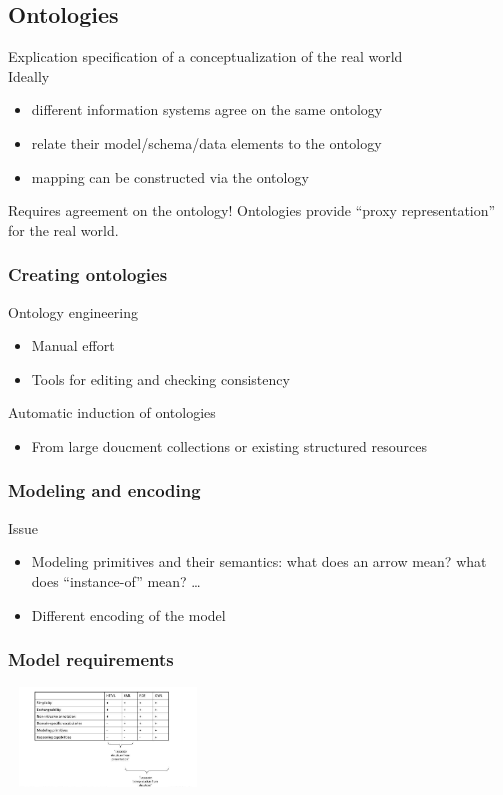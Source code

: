 \subsection{Ontologies}
Explication specification of a conceptualization of the real world \\
Ideally
\begin{itemize}
\item different information systems agree on the same ontology
\item relate their model/schema/data elements to the ontology
\item mapping can be constructed via the ontology
\end{itemize}

Requires agreement on the ontology! Ontologies provide ``proxy
representation'' for the real world.

\subsubsection{Creating ontologies}
Ontology engineering
\begin{itemize}
\item Manual effort
\item Tools for editing and checking consistency
\end{itemize}

Automatic induction of ontologies
\begin{itemize}
\item From large doucment collections or existing structured resources
\end{itemize}

\subsubsection{Modeling and encoding}
Issue
\begin{itemize}
\item Modeling primitives and their semantics: what does an arrow
  mean? what does ``instance-of'' mean? \ldots
\item Different encoding of the model
\end{itemize}

\subsubsection{Model requirements}
\includegraphics[height=100px, width=200px]{modelreq}

